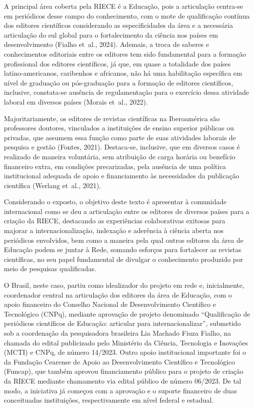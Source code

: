 \documentclass[
  a4paper,
]{book}
\begin{document}
A principal área coberta pela RIECE é a Educação, pois a articulação
centra-se em periódicos desse campo do conhecimento, com o mote de
qualificação contínua dos editores científicos considerando as
especificidades da área e a necessária articulação do sul global para o
fortalecimento da ciência nos países em desenvolvimento (Fialho et~al.,
2024). Ademais, a troca de saberes e conhecimentos editoriais entre os
editores tem sido fundamental para a formação profissional dos editores
científicos, já que, em quase a totalidade dos países latino-americanos,
caribenhos e africanos, não há uma habilitação específica em nível de
graduação ou pós-graduação para a formação de editores científicos,
inclusive, constata-se ausência de regulamentação para o exercício dessa
atividade laboral em diversos países (Morais et~al., 2022).

Majoritariamente, os editores de revistas científicas na Iberoamérica
são professores doutores, vinculados a instituições de ensino superior
públicas ou privadas, que assumem essa função como parte de suas
atividades laborais de pesquisa e gestão (Fontes, 2021). Destaca-se,
inclusive, que em diversos casos é realizado de maneira voluntária, sem
atribuição de carga horária ou benefício financeiro extra, em condições
precarizadas, pela ausência de uma política institucional adequada de
apoio e financiamento às necessidades da publicação científica (Werlang
et~al., 2021).

Considerando o exposto, o objetivo deste texto é apresentar à comunidade
internacional como se deu a articulação entre os editores de diversos
países para a criação da RIECE, destacando as experiências colaborativas
exitosas para majorar a internacionalização, indexação e aderência à
ciência aberta nos periódicos envolvidos, bem como a maneira pela qual
outros editores da área de Educação podem se juntar à Rede, somando
esforços para fortalecer as revistas científicas, no seu papel
fundamental de divulgar o conhecimento produzido por meio de pesquisas
qualificadas.

O Brasil, neste caso, partiu como idealizador do projeto em rede e,
inicialmente, coordenador central na articulação dos editores da área de
Educação, com o apoio financeiro do Conselho Nacional de Desenvolvimento
Científico e Tecnológico (CNPq), mediante aprovação de projeto
denominado ``Qualificação de periódicos científicos de Educação:
articular para internacionalizar'', submetido sob a coordenação da
pesquisadora brasileira Lia Machado Fiuza Fialho, na chamada do edital
publicizado pelo Ministério da Ciência, Tecnologia e Inovações (MCTI) e
CNPq, de número 14/2023. Outro apoio institucional importante foi o da
Fundação Cearense de Apoio ao Desenvolvimento Científico e Tecnológico
(Funcap), que também aprovou financiamento público para o projeto de
criação da RIECE mediante chamamento via edital público de número
06/2023. De tal modo, a iniciativa já começou com a aprovação e o
suporte financeiro de duas conceituadas instituições, respectivamente em
nível federal e estadual.
\end{document}

